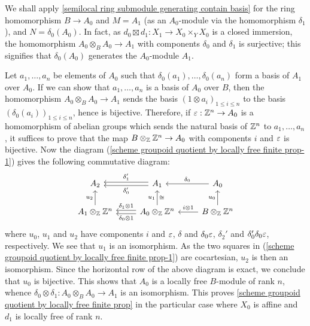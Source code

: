 We shall apply \cref{semilocal ring submodule generating contain basis} for the ring homomorphism $B\to A_0$ and $M=A_1$ (as an $A_0$-module via the homomorphism $\delta_1$), and $N=\delta_0(A_0)$. In fact, as $d_0\boxtimes d_1:X_1\to X_0\times_YX_0$ is a closed immersion, the homomorphism $A_0\otimes_BA_0\to A_1$ with components $\delta_0$ and $\delta_1$ is surjective; this signifies that $\delta_0(A_0)$ generates the $A_0$-module $A_1$.\par
Let $a_1,\dots,a_n$ be elements of $A_0$ such that $\delta_0(a_1),\dots,\delta_0(a_n)$ form a basis of $A_1$ over $A_0$. If we can show that $a_1,\dots,a_n$ is a basis of $A_0$ over $B$, then the homomorphism $A_0\otimes_BA_0\to A_1$ sends the basis $(1\otimes a_i)_{1\leq i\leq n}$ to the basis $(\delta_0(a_i))_{1\leq i\leq n}$, hence is bijective. Therefore, if $\varepsilon:\mathbb{Z}^n\to A_0$ is a homomorphism of abelian groups which sends the natural basis of $\mathbb{Z}^n$ to $a_1,\dots,a_n$, it suffices to prove that the map $B\otimes_{\mathbb{Z}}\mathbb{Z}^n\to A_0$ with components $i$ and $\varepsilon$ is bijective. Now the diagram (\ref{scheme groupoid quotient by locally free finite prop-1}) gives the following commutative diagram:
\[\begin{tikzcd}
A_2&A_1\ar[l,shift left=2pt,"\delta_0'"]\ar[l,shift right=2pt,swap,"\delta_1'"]&A_0\ar[l,swap,"\delta_0"]\\
A_1\otimes_{\Z}\Z^n\ar[u,"u_2"]&A_0\otimes_{\Z}\Z^n\ar[l,shift left=2pt,"\delta_0\otimes 1"]\ar[l,shift right=2pt,swap,"\delta_1\otimes 1"]\ar[u,"u_1","\cong"']&B\otimes_{\Z}\Z^n\ar[l,swap,"i\otimes 1"]\ar[u,"u_0"]
\end{tikzcd}\]
where $u_0$, $u_1$ and $u_2$ have components $i$ and $\varepsilon$, $\delta$ and $\delta_0\varepsilon$, $\delta_2'$ and $\delta_0'\delta_0\varepsilon$, respectively. We see that $u_1$ is an isomorphism. As the two squares in (\ref{scheme groupoid quotient by locally free finite prop-1}) are cocartesian, $u_2$ is then an isomorphism. Since the horizontal row of the above diagram is exact, we conclude that $u_0$ is bijective. This shows that $A_0$ is a locally free $B$-module of rank $n$, whence $\delta_0\otimes\delta_1:A_0\otimes_BA_0\to A_1$ is an isomorphism. This proves \cref{scheme groupoid quotient by locally free finite prop} in the particular case where $X_0$ is affine and $d_1$ is locally free of rank $n$.

